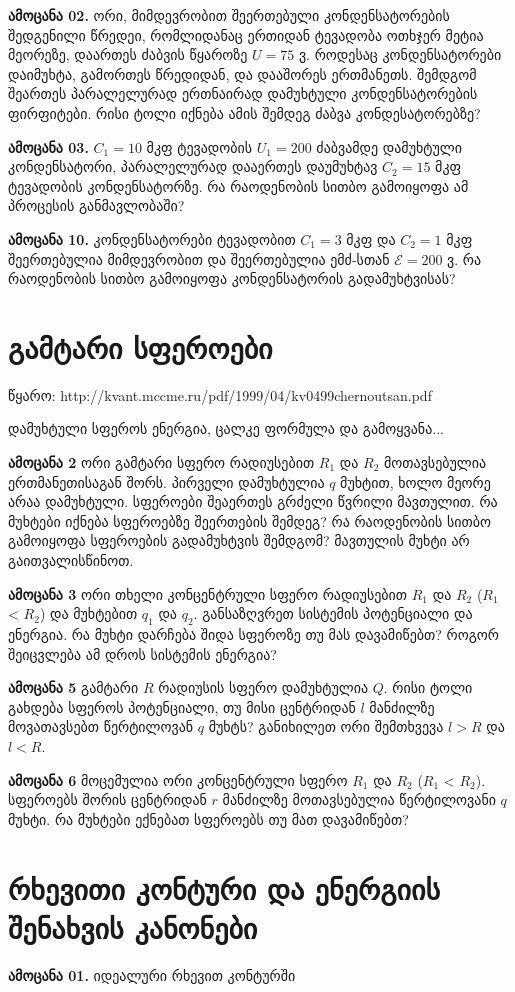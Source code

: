 \documentclass{book}
\begin{document}
\textbf{ამოცანა 02.} ორი, მიმდევრობით შეერთებული კონდენსატორების შედგენილი წრედეი, რომლიდანაც ერთიდან ტევადობა ოთხჯერ მეტია მეორეზე, დაართეს ძაბვის წყაროზე $U = 75$ ვ. როდესაც კონდენსატორები დაიმუხტა, გამორთეს წრედიდან, და დააშორეს ერთმანეთს. შემდგომ შეართეს პარალელურად ერთნაირად დამუხტული კონდენსატორების ფირფიტები. რისი ტოლი იქნება ამის შემდეგ ძაბვა კონდესატორებზე?

\textbf{ამოცანა 03.} $C_1 = 10$ მკფ ტევადობის $U_1=200$ ძაბვამდე დამუხტული კონდენსატორი, პარალელურად დააერთეს დაუმუხტავ $C_2 = 15$ მკფ ტევადობის კონდენსატორზე. რა რაოდენობის სითბო გამოიყოფა ამ პროცესის განმავლობაში?

\textbf{ამოცანა 10.} კონდენსატორები ტევადობით $C_1=3$ მკფ და $C_2=1$ მკფ შეერთებულია მიმდევრობით და შეერთებულია ემძ-სთან $\mathcal{E} = 200$ ვ. რა რაოდენობის სითბო გამოიყოფა კონდენსატორის გადამუხტვისას?

\section{გამტარი სფეროები}
წყარო: http://kvant.mccme.ru/pdf/1999/04/kv0499chernoutsan.pdf


დამუხტული სფეროს ენერგია, ცალკე ფორმულა და გამოყვანა...

\textbf{ამოცანა 2} ორი გამტარი სფერო რადიუსებით $R_1$ და $R_2$ მოთავსებულია ერთმანეთისაგან შორს. პირველი დამუხტულია $q$ მუხტით, ხოლო მეორე არაა დამუხტული. სფეროები შეაერთეს გრძელი წვრილი მავთულით. რა მუხტები იქნება სფეროებზე შეერთების შემდეგ? რა რაოდენობის სითბო გამოიყოფა სფეროების გადამუხტვის შემდგომ? მავთულის მუხტი არ გაითვალისწინოთ.

\textbf{ამოცანა 3} ორი თხელი კონცენტრული სფერო რადიუსებით $R_1$ და $R_2$ ($R_1$ < $R_2$) და მუხტებით $q_1$ და $q_2$. განსაზღვრეთ სისტემის პოტენციალი და ენერგია. რა მუხტი დარჩება შიდა სფეროზე თუ მას დავამიწებთ? როგორ შეიცვლება ამ დროს სისტემის ენერგია?

\textbf{ამოცანა 5} გამტარი $R$ რადიუსის სფერო დამუხტულია $Q$. რისი ტოლი გახდება სფეროს პოტენციალი, თუ მისი ცენტრიდან $l$ მანძილზე მოვათავსებთ წერტილოვან $q$ მუხტს? განიხილეთ ორი შემთხვევა $l > R$ და $l < R$.

\textbf{ამოცანა 6} მოცემულია ორი კონცენტრული სფერო $R_1$ და $R_2$ ($R_1$ < $R_2$). სფეროებს შორის ცენტრიდან $r$ მანძილზე მოთავსებულია წერტილოვანი $q$ მუხტი. რა მუხტები ექნებათ სფეროებს თუ მათ დავამიწებთ?

\section{რხევითი კონტური და ენერგიის შენახვის კანონები}
\textbf{ამოცანა 01.} იდეალური რხევით კონტურში 
\end{document}
